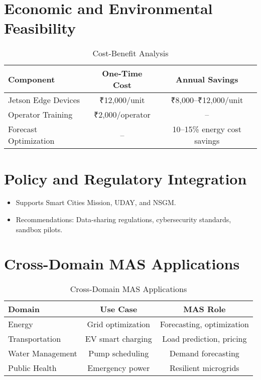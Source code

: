 \documentclass[12pt, a4paper, oneside]{book}
\begin{document}
\section{Economic and Environmental Feasibility}
\begin{table}[h]
    \centering
    \caption{Cost-Benefit Analysis}
    \begin{tabular}{lcc}
        \toprule
        \textbf{Component} & \textbf{One-Time Cost} & \textbf{Annual Savings} \\
        \midrule
        Jetson Edge Devices & ₹12,000/unit & ₹8,000–₹12,000/unit \\
        Operator Training & ₹2,000/operator & – \\
        Forecast Optimization & – & 10–15\% energy cost savings \\
        \bottomrule
    \end{tabular}
\end{table}

\section{Policy and Regulatory Integration}
\begin{itemize}
    \item Supports Smart Cities Mission, UDAY, and NSGM.
    \item Recommendations: Data-sharing regulations, cybersecurity standards, sandbox pilots.
\end{itemize}

\section{Cross-Domain MAS Applications}
\begin{table}[h]
    \centering
    \caption{Cross-Domain MAS Applications}
    \begin{tabular}{lcc}
        \toprule
        \textbf{Domain} & \textbf{Use Case} & \textbf{MAS Role} \\
        \midrule
        Energy & Grid optimization & Forecasting, optimization \\
        Transportation & EV smart charging & Load prediction, pricing \\
        Water Management & Pump scheduling & Demand forecasting \\
        Public Health & Emergency power & Resilient microgrids \\
        \bottomrule
    \end{tabular}
\end{table}
\end{document}
